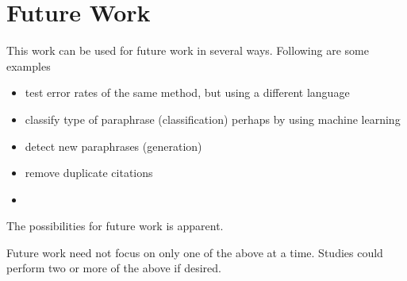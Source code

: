 \section {Future Work}
This work can be used for future work in several ways. Following are some examples 
	\begin {itemize}
		\item test error rates of the same method, but using a different language
		\item classify type of paraphrase (classification) perhaps by using machine learning
		\item detect new paraphrases (generation)
		\item remove duplicate citations
		\item [Insert more here]
	\end {itemize}
The possibilities for future work is apparent. 

Future work need not focus on only one of the above at a time.  Studies could perform two or more of the above if desired. 

